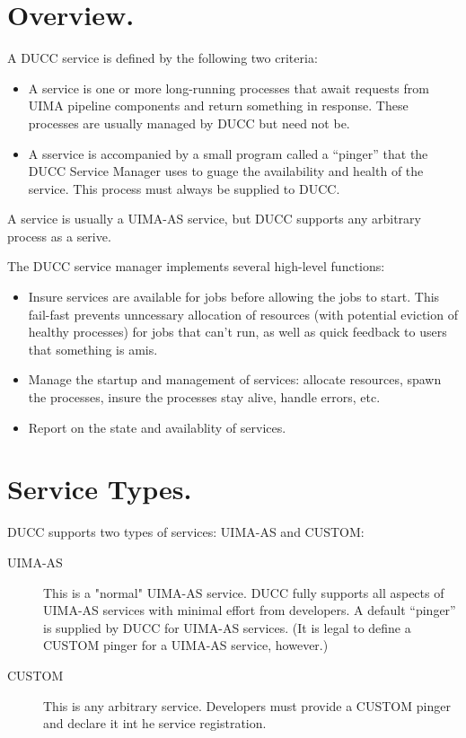 
      \section{Overview.} 
      A DUCC service is defined by the following two criteria:
      \begin{itemize}
          \item A service is one or more long-running processes that await requests from
            UIMA pipeline components and return something in response.  These processes
            are usually managed by DUCC but need not be.
          \item A sservice is accompanied by a small program called a ``pinger'' that
            the DUCC Service Manager uses to guage the availability and health of the
            service.  This process must always be supplied to DUCC.
      \end{itemize}

      A service is usually a UIMA-AS service, but DUCC supports any arbitrary process
      as a serive.

      The DUCC service manager implements several high-level functions:
      
      \begin{itemize}
          \item Insure services are available for jobs before allowing the jobs to start. This fail-fast
            prevents unncessary allocation of resources (with potential eviction of healthy processes)
            for jobs that can't run, as well as quick feedback to users that something is amis.
      
          \item Manage the startup and management of services: allocate resources, spawn the
            processes, insure the processes stay alive, handle errors, etc.
      
          \item Report on the state and availablity of services.
       \end{itemize}


    \section{Service Types.}
      DUCC supports two types of services: UIMA-AS and CUSTOM:
      
      \begin{description}
          \item[UIMA-AS] This is a "normal" UIMA-AS service. DUCC fully supports all aspects of UIMA-AS
            services with minimal effort from developers.  A default ``pinger'' is supplied by DUCC
            for UIMA-AS services.  (It is legal to define a CUSTOM pinger for a UIMA-AS service,
            however.)
            
          \item[CUSTOM] This is any arbitrary service.  Developers must provide a CUSTOM pinger
            and declare it int he service registration.            
      \end{description}

